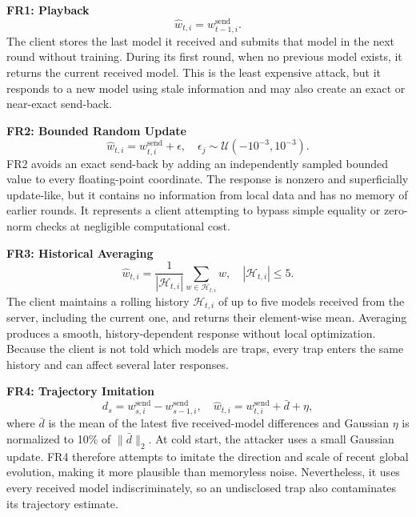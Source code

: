 \documentclass[conference]{IEEEtran}
\begin{document}
\medskip\noindent\textbf{FR1: Playback}
\begin{equation}
\widehat w_{t,i}=w^{\mathrm{send}}_{t-1,i}.
\end{equation}
The client stores the last model it received and submits that model in the next round without training. During its first round, when no previous model exists, it returns the current received model. This is the least expensive attack, but it responds to a new model using stale information and may also create an exact or near-exact send-back.

\medskip\noindent\textbf{FR2: Bounded Random Update}
\begin{equation}
\widehat w_{t,i}=w^{\mathrm{send}}_{t,i}+\epsilon,
\quad \epsilon_j\sim\mathcal U(-10^{-3},10^{-3}).
\end{equation}
FR2 avoids an exact send-back by adding an independently sampled bounded value to every floating-point coordinate. The response is nonzero and superficially update-like, but it contains no information from local data and has no memory of earlier rounds. It represents a client attempting to bypass simple equality or zero-norm checks at negligible computational cost.

\medskip\noindent\textbf{FR3: Historical Averaging}
\begin{equation}
\widehat w_{t,i}=\frac{1}{|\mathcal H_{t,i}|}
\sum_{w\in\mathcal H_{t,i}}w,
\quad |\mathcal H_{t,i}|\leq 5.
\end{equation}
The client maintains a rolling history $\mathcal H_{t,i}$ of up to five models received from the server, including the current one, and returns their element-wise mean. Averaging produces a smooth, history-dependent response without local optimization. Because the client is not told which models are traps, every trap enters the same history and can affect several later responses.

\medskip\noindent\textbf{FR4: Trajectory Imitation}
\begin{equation}
d_s=w^{\mathrm{send}}_{s,i}-w^{\mathrm{send}}_{s-1,i},\quad
\widehat w_{t,i}=w^{\mathrm{send}}_{t,i}+\bar d+\eta,
\end{equation}
where $\bar d$ is the mean of the latest five received-model differences and Gaussian $\eta$ is normalized to 10\% of $\lVert\bar d\rVert_2$. At cold start, the attacker uses a small Gaussian update. FR4 therefore attempts to imitate the direction and scale of recent global evolution, making it more plausible than memoryless noise. Nevertheless, it uses every received model indiscriminately, so an undisclosed trap also contaminates its trajectory estimate.
\end{document}

